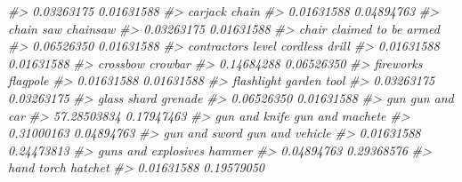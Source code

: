 \documentclass[
  12pt,
]{book}
\newenvironment{Shaded}{\begin{snugshade}}{\end{snugshade}}
\newcommand{\CommentTok}[1]{\textcolor[rgb]{0.37,0.37,0.37}{\textit{#1}}}
\begin{document}
\begin{Shaded}
\begin{Highlighting}[]
\CommentTok{\#\textgreater{}                       0.03263175                       0.01631588 }
\CommentTok{\#\textgreater{}                          carjack                            chain }
\CommentTok{\#\textgreater{}                       0.01631588                       0.04894763 }
\CommentTok{\#\textgreater{}                        chain saw                         chainsaw }
\CommentTok{\#\textgreater{}                       0.03263175                       0.01631588 }
\CommentTok{\#\textgreater{}                            chair              claimed to be armed }
\CommentTok{\#\textgreater{}                       0.06526350                       0.01631588 }
\CommentTok{\#\textgreater{}               contractor\textquotesingle{}s level                   cordless drill }
\CommentTok{\#\textgreater{}                       0.01631588                       0.01631588 }
\CommentTok{\#\textgreater{}                         crossbow                          crowbar }
\CommentTok{\#\textgreater{}                       0.14684288                       0.06526350 }
\CommentTok{\#\textgreater{}                        fireworks                         flagpole }
\CommentTok{\#\textgreater{}                       0.01631588                       0.01631588 }
\CommentTok{\#\textgreater{}                       flashlight                      garden tool }
\CommentTok{\#\textgreater{}                       0.03263175                       0.03263175 }
\CommentTok{\#\textgreater{}                      glass shard                          grenade }
\CommentTok{\#\textgreater{}                       0.06526350                       0.01631588 }
\CommentTok{\#\textgreater{}                              gun                      gun and car }
\CommentTok{\#\textgreater{}                      57.28503834                       0.17947463 }
\CommentTok{\#\textgreater{}                    gun and knife                  gun and machete }
\CommentTok{\#\textgreater{}                       0.31000163                       0.04894763 }
\CommentTok{\#\textgreater{}                    gun and sword                  gun and vehicle }
\CommentTok{\#\textgreater{}                       0.01631588                       0.24473813 }
\CommentTok{\#\textgreater{}              guns and explosives                           hammer }
\CommentTok{\#\textgreater{}                       0.04894763                       0.29368576 }
\CommentTok{\#\textgreater{}                       hand torch                          hatchet }
\CommentTok{\#\textgreater{}                       0.01631588                       0.19579050 }

\end{Highlighting}
\end{Shaded}
\end{document}
